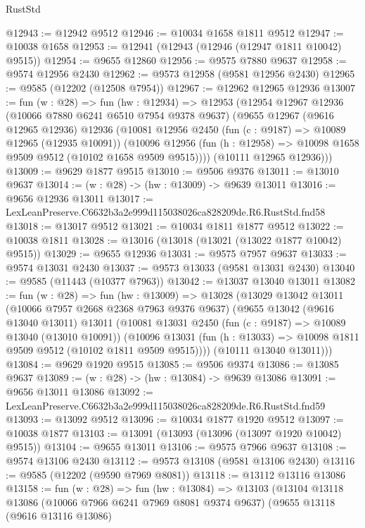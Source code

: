 \begin{lexlean}{RustStd}
\begin{coremodule}
@12943 := @12942 @9512
@12946 := @10034 @1658 @1811 @9512
@12947 := @10038 @1658
@12953 := @12941 (@12943 (@12946 (@12947 @1811 @10042) @9515))
@12954 := @9655 @12860
@12956 := @9575 @7880 @9637
@12958 := @9574 @12956 @2430
@12962 := @9573 @12958 (@9581 @12956 @2430)
@12965 := @9585 (@12202 (@12508 @7954))
@12967 := @12962 @12965 @12936
@13007 := fun (w : @28) =>
  fun (hw : @12934) =>
  @12953
    (@12954
      @12967
      @12936
      (@10066 @7880 @6241 @6510 @7954 @9378 @9637)
      (@9655
        @12967
        (@9616 @12965 @12936)
        @12936
        (@10081
          @12956
          @2450
          (fun (c : @9187) => @10089 @12965 (@12935 @10091))
          (@10096 @12956 (fun (h : @12958) => @10098 @1658 @9509 @9512 (@10102 @1658 @9509 @9515))))
        (@10111 @12965 @12936)))
@13009 := @9629 @1877 @9515
@13010 := @9506 @9376
@13011 := @13010 @9637
@13014 := (w : @28) -> (hw : @13009) -> @9639 @13011
@13016 := @9656 @12936 @13011
@13017 := LexLeanPreserve.C6632b3a2e999d115038026ca828209de.R6.RustStd.fnd58
@13018 := @13017 @9512
@13021 := @10034 @1811 @1877 @9512
@13022 := @10038 @1811
@13028 := @13016 (@13018 (@13021 (@13022 @1877 @10042) @9515))
@13029 := @9655 @12936
@13031 := @9575 @7957 @9637
@13033 := @9574 @13031 @2430
@13037 := @9573 @13033 (@9581 @13031 @2430)
@13040 := @9585 (@11443 (@10377 @7963))
@13042 := @13037 @13040 @13011
@13082 := fun (w : @28) =>
  fun (hw : @13009) =>
  @13028
    (@13029
      @13042
      @13011
      (@10066 @7957 @2668 @2368 @7963 @9376 @9637)
      (@9655
        @13042
        (@9616 @13040 @13011)
        @13011
        (@10081
          @13031
          @2450
          (fun (c : @9187) => @10089 @13040 (@13010 @10091))
          (@10096 @13031 (fun (h : @13033) => @10098 @1811 @9509 @9512 (@10102 @1811 @9509 @9515))))
        (@10111 @13040 @13011)))
@13084 := @9629 @1920 @9515
@13085 := @9506 @9374
@13086 := @13085 @9637
@13089 := (w : @28) -> (hw : @13084) -> @9639 @13086
@13091 := @9656 @13011 @13086
@13092 := LexLeanPreserve.C6632b3a2e999d115038026ca828209de.R6.RustStd.fnd59
@13093 := @13092 @9512
@13096 := @10034 @1877 @1920 @9512
@13097 := @10038 @1877
@13103 := @13091 (@13093 (@13096 (@13097 @1920 @10042) @9515))
@13104 := @9655 @13011
@13106 := @9575 @7966 @9637
@13108 := @9574 @13106 @2430
@13112 := @9573 @13108 (@9581 @13106 @2430)
@13116 := @9585 (@12202 (@9590 @7969 @8081))
@13118 := @13112 @13116 @13086
@13158 := fun (w : @28) =>
  fun (hw : @13084) =>
  @13103
    (@13104
      @13118
      @13086
      (@10066 @7966 @6241 @7969 @8081 @9374 @9637)
      (@9655
        @13118
        (@9616 @13116 @13086)

\end{coremodule}
\end{lexlean}
